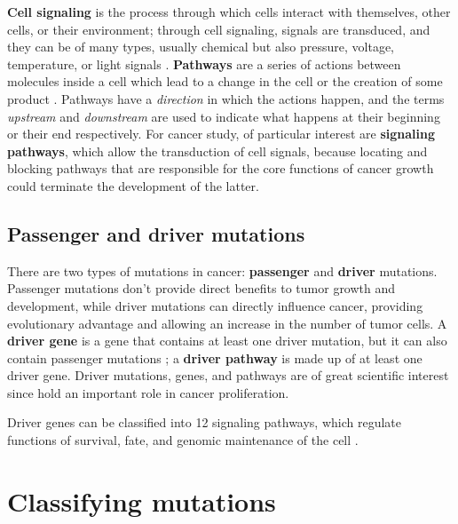 \textbf{Cell signaling} is the process through which cells interact with themselves, other cells, or their environment; through cell signaling, signals are transduced, and they can be of many types, usually chemical but also pressure, voltage, temperature, or light signals \cite{cell_signaling}. \textbf{Pathways} are a series of actions between molecules inside a cell which lead to a change in the cell or the creation of some product \cite{pathway}. Pathways have a \textit{direction} in which the actions happen, and the terms \textit{upstream} and \textit{downstream} are used to indicate what happens at their beginning or their end respectively. For cancer study, of particular interest are \textbf{signaling pathways}, which allow the transduction of cell signals, because locating and blocking pathways that are responsible for the core functions of cancer growth could terminate the development of the latter. 

\subsection{Passenger and driver mutations}

There are two types of mutations in cancer: \textbf{passenger} and \textbf{driver} mutations. Passenger mutations don't provide direct benefits to tumor growth and development, while driver mutations can directly influence cancer, providing evolutionary advantage and allowing an increase in the number of tumor cells. A \textbf{driver gene} is a gene that contains at least one driver mutation, but it can also contain passenger mutations ; a \textbf{driver pathway} is made up of at least one driver gene. Driver mutations, genes, and pathways are of great scientific interest since hold an important role in cancer proliferation.

Driver genes can be classified into 12 signaling pathways, which regulate functions of survival, fate, and genomic maintenance of the cell .

\section{Classifying mutations}

